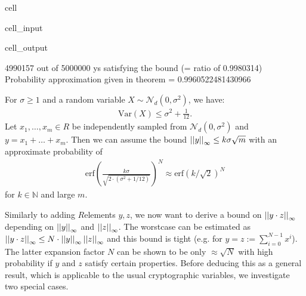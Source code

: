 \documentclass[letterpaper,10pt,english]{jupyterBook}
\begin{document}
\begin{sphinxuseclass}{cell}
\begin{sphinxVerbatimInput}
\begin{sphinxuseclass}{cell_input}
\end{sphinxuseclass}\end{sphinxVerbatimInput}
\begin{sphinxVerbatimOutput}

\begin{sphinxuseclass}{cell_output}
\begin{sphinxVerbatim}[commandchars=\\\{\}]
4990157 out of 5000000 y\PYGZsq{}s satisfying the bound (= ratio of 0.9980314)
Probability approximation given in theorem = 0.9960522481430966
\end{sphinxVerbatim}

\end{sphinxuseclass}\end{sphinxVerbatimOutput}

\end{sphinxuseclass}\label{\detokenize{Thesis:bound-for-multiplying-two-ring-elements}}
\sphinxAtStartPar
For \(\sigma \ge 1\) and a random variable \(X\sim \mathcal N_d(0,\sigma^2)\), we have:
\begin{equation*}
\begin{split}\mathrm{Var}(X) \le \sigma^2 + \frac{1}{12}.\end{split}
\end{equation*}
\sphinxAtStartPar
Let \(x_1,\dots,x_m \in R\) be independently sampled from \(\mathcal N_d(0,\sigma^2)\) and \(y = x_1+\dots+x_m\). Then we can assume the bound \(\left\lvert\left\lvert y \right\rvert\right\rvert_\infty \le k\sigma \sqrt{m}\) with an approximate probability of
\begin{equation*}
\begin{split}\mathrm{erf}\left( \frac{k\sigma}{\sqrt{2\cdot(\sigma^2+1/12)}} \right)^N \approx \mathrm{erf}(k/\sqrt{2})^N\end{split}
\end{equation*}
\sphinxAtStartPar
for \(k \in \mathbb N\) and large \(m\).

\begin{DUlineblock}{0em}
\item[] 
\end{DUlineblock}

\sphinxAtStartPar
Similarly to adding \(R\)\sphinxhyphen{}elements \(y,z\), we now want to derive a bound on \(\left\lvert\left\lvert y \cdot z \right\rvert\right\rvert_\infty\) depending on \(\left\lvert\left\lvert y \right\rvert\right\rvert_\infty\) and \(\left\lvert\left\lvert z \right\rvert\right\rvert_\infty\).
The worst\sphinxhyphen{}case can be estimated as \(\left\lvert\left\lvert y \cdot z \right\rvert\right\rvert_\infty \le N \cdot \left\lvert\left\lvert y \right\rvert\right\rvert_\infty \left\lvert\left\lvert z \right\rvert\right\rvert_\infty\) and this bound is tight (e.g. for \(y = z := \sum_{i=0}^{N-1} x^i\)).
The latter expansion factor \(N\) can be shown to be only \(\approx \sqrt{N}\) with high probability if \(y\) and \(z\) satisfy certain properties.
Before deducing this as a general result, which is applicable to the usual cryptographic variables, we investigate two special cases.
\end{document}

